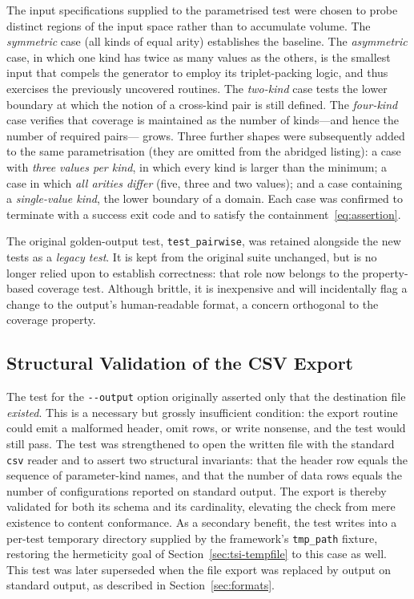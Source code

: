 \documentclass[
  digital, %
  oneside, %
  lof,     %
  nolot,     %
]{fithesis4}
\begin{document}
The input specifications supplied to the parametrised test were chosen to probe
distinct regions of the input space rather than to accumulate volume. The
\emph{symmetric} case (all kinds of equal arity) establishes the baseline. The
\emph{asymmetric} case, in which one kind has twice as many values as the others,
is the smallest input that compels the generator to employ its triplet-packing
logic, and thus exercises the previously uncovered routines. The
\emph{two-kind} case tests the lower boundary at which the notion of a cross-kind
pair is still defined. The \emph{four-kind} case verifies that coverage is
maintained as the number of kinds---and hence the number of required pairs---
grows. Three further shapes were subsequently added to the same
parametrisation (they are omitted from the abridged listing): a case with
\emph{three values per kind}, in which every kind is larger than the minimum; a
case in which \emph{all arities differ} (five, three and two values); and a case
containing a \emph{single-value kind}, the lower boundary of a domain. Each case
was confirmed to terminate with a success exit code and to satisfy the
containment~\eqref{eq:assertion}.

The original golden-output test, \texttt{test\_pairwise}, was retained alongside
the new tests as a \emph{legacy test}. It is kept from the original suite
unchanged, but is no longer relied upon to establish correctness: that role now
belongs to the property-based coverage test. Although brittle, it is inexpensive
and will incidentally flag a change to the output's human-readable format, a
concern orthogonal to the coverage property.

\subsection{Structural Validation of the CSV Export}
\label{sec:tsi-csv}

The test for the \texttt{-{}-output} option originally asserted only that the
destination file \emph{existed}. This is a necessary but grossly insufficient
condition: the export routine could emit a malformed header, omit rows, or write
nonsense, and the test would still pass. The test was strengthened to open the
written file with the standard \texttt{csv} reader and to assert two structural
invariants: that the header row equals the sequence of parameter-kind names, and
that the number of data rows equals the number of configurations reported on
standard output. The export is thereby validated for both its schema and its
cardinality, elevating the check from mere existence to content conformance. As a
secondary benefit, the test writes into a per-test temporary directory supplied
by the framework's \texttt{tmp\_path} fixture, restoring the hermeticity goal of
Section~\ref{sec:tsi-tempfile} to this case as well. This test was later
superseded when the file export was replaced by output on standard output, as
described in Section~\ref{sec:formats}.
\end{document}
